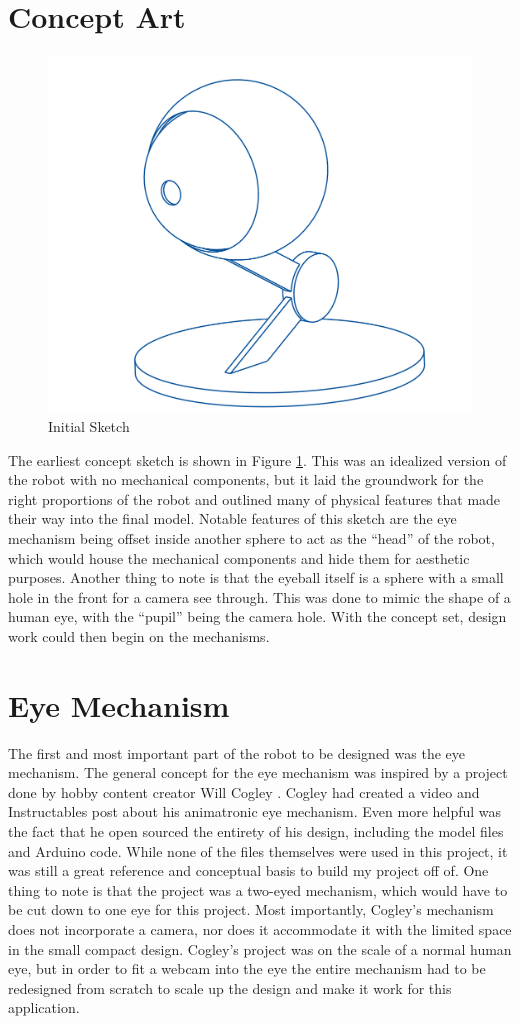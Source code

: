 \section{Concept Art}
\begin{figure}[h]
    \centering
    \includegraphics[width=0.5\linewidth]{Thesis/ch2/sketch.png}
    \caption{Initial Sketch}
    \label{fig:sketch}
\end{figure}
The earliest concept sketch is shown in Figure \ref{fig:sketch}. This was an idealized version of the robot with no mechanical components, but it laid the groundwork for the right proportions of the robot and outlined many of physical features that made their way into the final model. Notable features of this sketch are the eye mechanism being offset inside another sphere to act as the “head” of the robot, which would house the mechanical components and hide them for aesthetic purposes. Another thing to note is that the eyeball itself is a sphere with a small hole in the front for a camera see through. This was done to mimic the shape of a human eye, with the “pupil” being the camera hole. With the concept set, design work could then begin on the mechanisms.

\section{Eye Mechanism}
The first and most important part of the robot to be designed was the eye mechanism. The general concept for the eye mechanism was inspired by a project done by hobby content creator Will Cogley \cite{cogleyDIYCompact3D2019}. Cogley had created a video and Instructables post about his animatronic eye mechanism. Even more helpful was the fact that he open sourced the entirety of his design, including the model files and Arduino code. While none of the files themselves were used in this project, it was still a great reference and conceptual basis to build my project off of. One thing to note is that the project was a two-eyed mechanism, which would have to be cut down to one eye for this project. Most importantly, Cogley's mechanism does not incorporate a camera, nor does it accommodate it with the limited space in the small compact design. Cogley's project was on the scale of a normal human eye, but in order to fit a webcam into the eye the entire mechanism had to be redesigned from scratch to scale up the design and make it work for this application.

